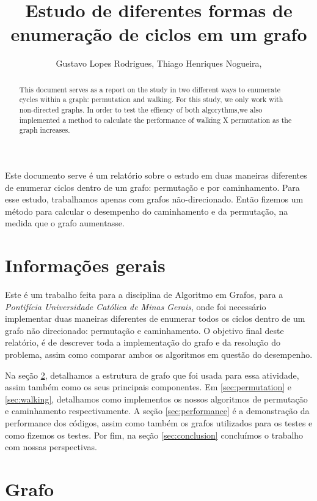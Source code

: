\documentclass[12pt]{article}
\title{Estudo de diferentes formas de enumeração de ciclos em um grafo}
\author{Gustavo Lopes Rodrigues\inst{1}, Thiago Henriques Nogueira\inst{2},}
\begin{document}
 

\maketitle

\begin{abstract} 
  This document serves as a report on the study in two different ways
  to enumerate cycles within a graph: permutation and walking. For this
  study, we only work with non-directed graphs. In order to test the effiency 
  of both algorythms,we also implemented a method to calculate the performance of walking
  X permutation as the graph increases.
\end{abstract}

\begin{resumo} 
  Este documento serve é um relatório sobre o estudo em duas maneiras 
  diferentes de enumerar ciclos dentro de um grafo: permutação e por caminhamento. Para esse 
  estudo, trabalhamos apenas com grafos não-direcionado. Então fizemos um método
  para calcular o desempenho do caminhamento e da permutação, na medida que o grafo aumentasse.
\end{resumo}


\section{Informações gerais}

  Este é um trabalho feita para a disciplina de Algoritmo em Grafos, para a 
  \emph{Pontifícia Universidade Católica de Minas Gerais}, onde foi necessário 
  implementar duas maneiras diferentes de enumerar todos os ciclos dentro de um 
  grafo não direcionado: permutação e caminhamento. O objetivo final  deste relatório, 
  é de descrever toda a implementação do grafo e da resolução do problema, assim como 
  comparar ambos os algoritmos em questão do desempenho.

  Na seção \ref{sec:graph}, detalhamos a estrutura de grafo que foi usada para essa atividade,
  assim também como os seus principais componentes. Em \ref{sec:permutation} e \ref{sec:walking},
  detalhamos como implementos os nossos algoritmos de permutação e caminhamento respectivamente.
  A seção \ref{sec:performance} é a demonstração da performance dos códigos, assim como também 
  os grafos utilizados para os testes e como fizemos os testes. Por fim, na seção \ref{sec:conclusion}
  concluímos o trabalho com nossas perspectivas.

  \section{Grafo} \label{sec:graph}
\end{document}
